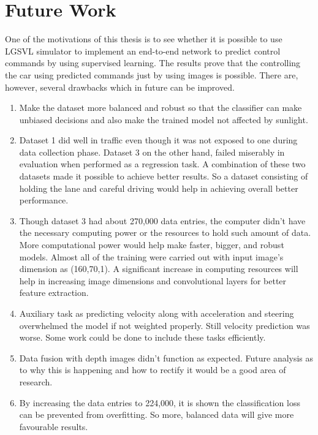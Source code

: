 \chapter{Future Work}
One of the motivations of this thesis is to see whether it is possible to use LGSVL
simulator to implement an end-to-end network to predict control commands by using
supervised learning. The results prove that the controlling the car using predicted
commands just by using images is possible. 
There are, however, several drawbacks which in future can be improved.
\begin{enumerate}
    \item Make the dataset more balanced and robust so that the classifier can make unbiased
        decisions and also make the trained model not affected by sunlight.
    \item Dataset 1 did well in traffic even though it was not exposed to one during data
        collection phase. Dataset 3 on the other hand, failed miserably in evaluation when
        performed as a regression task. A combination of these two datasets made it
        possible to achieve better results. So a dataset consisting of holding the lane
        and careful driving would help in achieving overall better performance.
    \item Though dataset 3 had about 270,000 data entries, the computer didn't have the
        necessary computing power or the resources to hold such amount of data. More
        computational power would help make faster, bigger, and robust models.  Almost all of the training were carried out with input image's dimension as (160,70,1). A significant increase in computing resources will help in increasing image dimensions and convolutional layers for better feature extraction.
    \item Auxiliary task as predicting velocity along with acceleration and steering
        overwhelmed the model if not weighted properly. Still velocity prediction was
        worse. Some work could be done to include these tasks efficiently.
    \item Data fusion with depth images didn't function as expected. Future analysis as to why this is happening and how to rectify it would be a good area of research.
    \item By increasing the data entries to 224,000, it is shown the classification loss can be prevented from overfitting. So more, balanced data will give more favourable results.
\end{enumerate}

